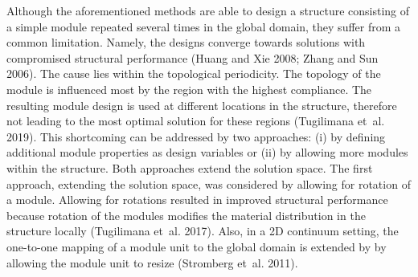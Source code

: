 Although the aforementioned methods are able to design a structure consisting of a simple module repeated several times in the global domain, they suffer from a common limitation. Namely, the designs converge towards solutions with compromised structural performance (Huang and Xie 2008; Zhang and Sun 2006). The cause lies within the topological periodicity. The topology of the module is influenced most by the region with the highest compliance. The resulting module design is used at different locations in the structure, therefore not leading to the most optimal solution for these regions (Tugilimana et al. 2019). This shortcoming can be addressed by two approaches: (i) by defining additional module properties as design variables or (ii) by allowing more modules within the structure. Both approaches extend the solution space. The first approach, extending the solution space, was considered by allowing for rotation of a module. Allowing for rotations resulted in improved structural performance because rotation of the modules modifies the material distribution in the structure locally (Tugilimana et al. 2017). Also, in a 2D continuum setting, the one-to-one mapping of a module unit to the global domain is extended by by allowing the module unit to resize (Stromberg et al. 2011). ~